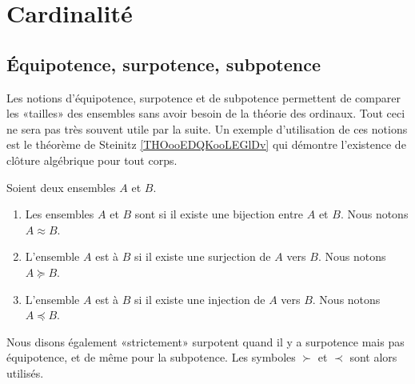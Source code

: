 \section{Cardinalité}
\label{SECooCardinalite}


\subsection{Équipotence, surpotence, subpotence}
\label{SUBooEquiSurSubpotence}

\begin{normaltext}	\label{NORMooEquiSurSubpotence}
	Les notions d'équipotence, surpotence et de subpotence permettent de comparer les «tailles» des ensembles sans avoir besoin de la théorie des ordinaux. Tout ceci ne sera pas très souvent utile par la suite. Un exemple d'utilisation de ces notions est le théorème de Steinitz \ref{THOooEDQKooLEGlDv} qui démontre l'existence de clôture algébrique pour tout corps.
\end{normaltext}

\begin{definition}      \label{DEFooXGXZooIgcBCg}
	Soient deux ensembles \( A\) et \( B\).
	\begin{enumerate}
		\item
		      Les ensembles \( A\) et \( B\) sont  si il existe une bijection entre \( A\) et \( B\). Nous notons \( A\approx B\).
		\item
		      L'ensemble \( A\) est  à \( B\) si il existe une surjection de \( A\) vers \( B\). Nous notons \( A\succeq B\).
		\item
		      L'ensemble \( A\) est  à \( B\) si il existe une injection de \( A\) vers \( B\). Nous notons \( A\preceq B\).
	\end{enumerate}
	Nous disons également «strictement» surpotent quand il y a surpotence mais pas équipotence, et de même pour la subpotence. Les symboles \( \succ\) et \( \prec\) sont alors utilisés.
\end{definition}

